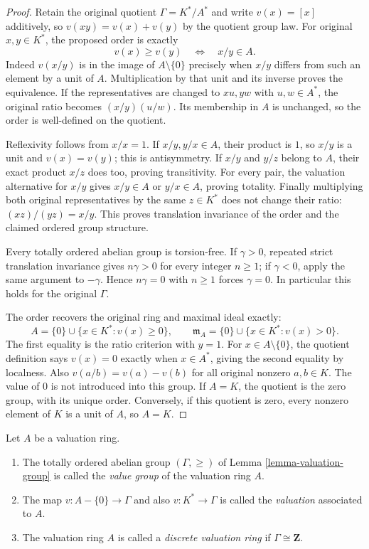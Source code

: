 \begin{proof}
Retain the original quotient
$\Gamma=K^*/A^*$ and write
$v(x)=[x]$ additively, so
$v(xy)=v(x)+v(y)$ by the
quotient group law. For original
$x,y\in K^*$, the proposed
order is exactly
$$
v(x)\geq v(y)\quad\Longleftrightarrow\quad x/y\in A.
$$
Indeed $v(x/y)$ is in the
image of $A\setminus\{0\}$
precisely when $x/y$ differs
from such an element by
a unit of $A$. Multiplication
by that unit and its inverse
proves the equivalence.
If the representatives are
changed to $xu,yw$ with
$u,w\in A^*$, the original
ratio becomes $(x/y)(u/w)$.
Its membership in $A$ is
unchanged, so the order is
well-defined on the quotient.

Reflexivity follows from $x/x=1$.
If $x/y,y/x\in A$, their
product is $1$, so $x/y$
is a unit and $v(x)=v(y)$;
this is antisymmetry. If
$x/y$ and $y/z$ belong
to $A$, their exact product
$x/z$ does too, proving
transitivity. For every pair,
the valuation alternative for
$x/y$ gives $x/y\in A$
or $y/x\in A$, proving
totality. Finally multiplying
both original representatives
by the same $z\in K^*$
does not change their ratio:
$(xz)/(yz)=x/y$. This
proves translation invariance
of the order and the
claimed ordered group structure.

Every totally ordered abelian
group is torsion-free. If
$\gamma>0$, repeated strict
translation invariance gives
$n\gamma>0$ for every integer
$n\geq1$; if $\gamma<0$,
apply the same argument to
$-\gamma$. Hence $n\gamma=0$
with $n\geq1$ forces
$\gamma=0$. In particular
this holds for the original
$\Gamma$.

The order recovers the
original ring and maximal
ideal exactly:
$$
A=\{0\}\cup\{x\in K^*:v(x)\geq0\},\qquad
\mathfrak m_A=\{0\}\cup\{x\in K^*:v(x)>0\}.
$$
The first equality is the
ratio criterion with $y=1$.
For $x\in A\setminus\{0\}$,
the quotient definition says
$v(x)=0$ exactly when
$x\in A^*$, giving the
second equality by localness.
Also $v(a/b)=v(a)-v(b)$
for all original nonzero
$a,b\in K$. The value
of $0$ is not introduced
into this group. If $A=K$,
the quotient is the zero
group, with its unique order.
Conversely, if this quotient
is zero, every nonzero
element of $K$ is a unit
of $A$, so $A=K$.
\end{proof}

\begin{definition}
\label{definition-value-group}
Let $A$ be a valuation ring.
\begin{enumerate}
\item The totally ordered abelian group $(\Gamma, \geq)$ of
Lemma \ref{lemma-valuation-group} is called the
{\it value group} of the valuation ring $A$.
\item The map $v : A - \{0\} \to \Gamma$ and also $v : K^* \to \Gamma$ is
called the {\it valuation} associated to $A$.
\item The valuation ring $A$ is called a {\it discrete valuation ring}
if $\Gamma \cong \mathbf{Z}$.
\end{enumerate}
\end{definition}

